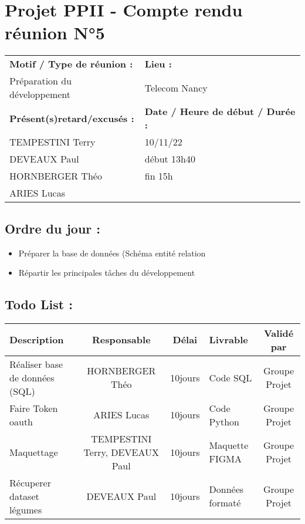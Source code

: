 \documentclass{article}
\begin{document}
\section*{Projet PPII - Compte rendu réunion N°5}
\begin{tabular}{|p{7cm}|p{6cm}|}
    \hline
    \textbf{Motif / Type de réunion :}
    & \textbf{Lieu :}
    \\
    Préparation du développement
    & 
    Telecom Nancy
    \\ \hline
    \textbf{Présent(s)retard/excusés :}
    &
    \textbf{Date / Heure de début / Durée :}
    \\ 
    TEMPESTINI Terry &  10/11/22\\  
    DEVEAUX Paul & début 13h40\\
    HORNBERGER Théo & fin 15h\\
    ARIES Lucas & 
    \\ \hline
\end{tabular}

\subsection*{Ordre du jour :}
\begin{itemize}
    \item{Préparer la base de données (Schéma entité relation}
    \item{Répartir les principales tâches du développement}
\end{itemize}

\subsection*{Todo List :}
\begin{tabular}{|p{3.5cm}|c|c|p{4.5cm}|c|}
    \hline 
    Description & Responsable & Délai & Livrable & Validé par 
    \\ \hline
    Réaliser base de données (SQL) & HORNBERGER Théo & 10jours & Code SQL & Groupe Projet \\ \hline
    Faire Token oauth & ARIES Lucas & 10jours & Code Python & Groupe Projet \\ \hline
    Maquettage & TEMPESTINI Terry, DEVEAUX Paul & 10jours & Maquette FIGMA & Groupe Projet\\ \hline
    Récuperer dataset légumes & DEVEAUX Paul  & 10jours & Données formaté & Groupe Projet\\ \hline
\end{tabular}
\end{document}

